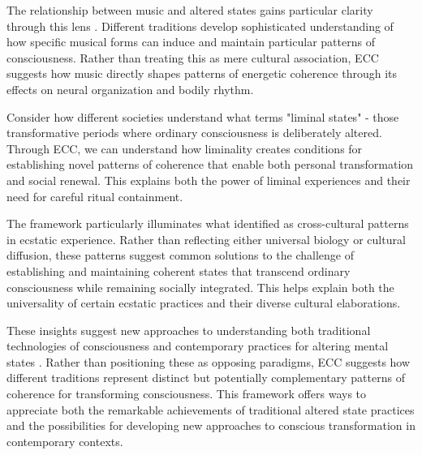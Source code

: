 The relationship between music and altered states gains particular clarity through this lens \cite{rouget1985music}. Different traditions develop sophisticated understanding of how specific musical forms can induce and maintain particular patterns of consciousness. Rather than treating this as mere cultural association, ECC suggests how music directly shapes patterns of energetic coherence through its effects on neural organization and bodily rhythm.

Consider how different societies understand what \cite{turner1969ritual} terms "liminal states" - those transformative periods where ordinary consciousness is deliberately altered. Through ECC, we can understand how liminality creates conditions for establishing novel patterns of coherence that enable both personal transformation and social renewal. This explains both the power of liminal experiences and their need for careful ritual containment.

The framework particularly illuminates what \cite{goodman1988ecstasy} identified as cross-cultural patterns in ecstatic experience. Rather than reflecting either universal biology or cultural diffusion, these patterns suggest common solutions to the challenge of establishing and maintaining coherent states that transcend ordinary consciousness while remaining socially integrated. This helps explain both the universality of certain ecstatic practices and their diverse cultural elaborations.

These insights suggest new approaches to understanding both traditional technologies of consciousness and contemporary practices for altering mental states \cite{winkelman2010shamanism}. Rather than positioning these as opposing paradigms, ECC suggests how different traditions represent distinct but potentially complementary patterns of coherence for transforming consciousness. This framework offers ways to appreciate both the remarkable achievements of traditional altered state practices and the possibilities for developing new approaches to conscious transformation in contemporary contexts.